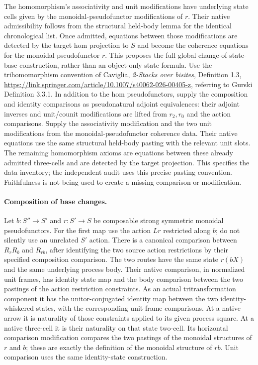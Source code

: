 \documentclass{article}
\begin{document}
The homomorphism's associativity and unit modifications have underlying state cells given by the monoidal-pseudofunctor modifications of $r$. Their native admissibility follows from the structural held-body lemma for the identical chronological list. Once admitted, equations between those modifications are detected by the target hom projection to $S$ and become the coherence equations for the monoidal pseudofunctor $r$. This proposes the full global change-of-state-base construction, rather than an object-only state formula. Use the trihomomorphism convention of Caviglia, \emph{2-Stacks over bisites}, Definition 1.3, \url{https://link.springer.com/article/10.1007/s40062-026-00405-z}, referring to Gurski Definition 3.3.1. In addition to the hom pseudofunctors, supply the composition and identity comparisons as pseudonatural adjoint equivalences: their adjoint inverses and unit/counit modifications are lifted from $r_2,r_0$ and the action comparisons. Supply the associativity modification and the two unit modifications from the monoidal-pseudofunctor coherence data. Their native equations use the same structural held-body pasting with the relevant unit slots. The remaining homomorphism axioms are equations between these already admitted three-cells and are detected by the target projection. This specifies the data inventory; the independent audit uses this precise pasting convention. Faithfulness is not being used to create a missing comparison or modification.

\paragraph{Composition of base changes.} Let $b:S''\to S'$ and $r:S'\to S$ be composable strong symmetric monoidal pseudofunctors. For the first map use the action $Lr$ restricted along $b$; do not silently use an unrelated $S'$ action. There is a canonical comparison between $R_rR_b$ and $R_{rb}$, after identifying the two source action restrictions by their specified composition comparison. The two routes have the same state $r(bX)$ and the same underlying process body. Their native comparison, in normalized unit frames, has identity state map and the body comparison between the two pastings of the action restriction constraints. As an actual tritransformation component it has the unitor-conjugated identity map between the two identity-whiskered states, with the corresponding unit-frame comparisons. At a native arrow it is naturality of those constraints applied to its given process square. At a native three-cell it is their naturality on that state two-cell. Its horizontal comparison modification compares the two pastings of the monoidal structures of $r$ and $b$; these are exactly the definition of the monoidal structure of $rb$. Unit comparison uses the same identity-state construction.
\end{document}
